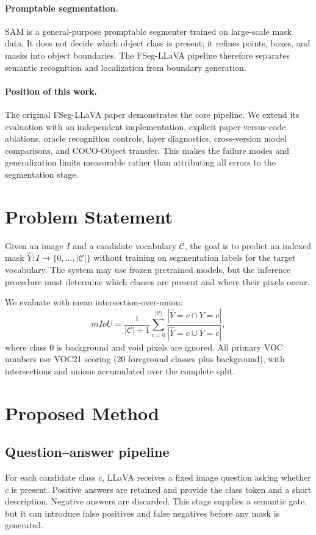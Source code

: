 \documentclass{article}
\newcommand{\method}{FSeg-LLaVA}
\newcommand{\miou}{mIoU}
\begin{document}
\paragraph{Promptable segmentation.}
SAM is a general-purpose promptable segmenter trained on large-scale mask data. It does not decide
which object class is present; it refines points, boxes, and masks into object boundaries. The
\method{} pipeline therefore separates semantic recognition and localization from boundary
generation.

\paragraph{Position of this work.}
The original \method{} paper demonstrates the core pipeline. We extend its evaluation with an
independent implementation, explicit paper-versus-code ablations, oracle recognition controls,
layer diagnostics, cross-version model comparisons, and COCO-Object transfer. This makes the
failure modes and generalization limits measurable rather than attributing all errors to the
segmentation stage.

\section{Problem Statement}
\label{sec:problem}
Given an image $I$ and a candidate vocabulary $\mathcal{C}$, the goal is to predict an indexed
mask $\hat{Y}: I \rightarrow \{0,\ldots,|\mathcal{C}|\}$ without training on segmentation labels
for the target vocabulary. The system may use frozen pretrained models, but the inference
procedure must determine which classes are present and where their pixels occur.

We evaluate with mean intersection-over-union:
\[
\miou{} = \frac{1}{|\mathcal{C}|+1}\sum_{c=0}^{|\mathcal{C}|}
\frac{|\hat{Y}=c \cap Y=c|}{|\hat{Y}=c \cup Y=c|},
\]
where class $0$ is background and void pixels are ignored. All primary VOC numbers use VOC21
scoring (20 foreground classes plus background), with intersections and unions accumulated over
the complete split.

\section{Proposed Method}
\label{sec:method}
\subsection{Question--answer pipeline}
For each candidate class $c$, LLaVA receives a fixed image question asking whether $c$ is
present. Positive answers are retained and provide the class token and a short description.
Negative answers are discarded. This stage supplies a semantic gate, but it can introduce false
positives and false negatives before any mask is generated.
\end{document}
